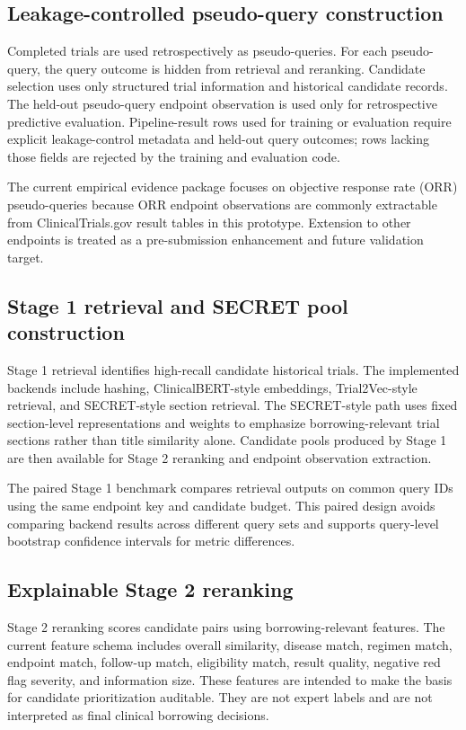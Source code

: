 \documentclass[11pt]{article}
\begin{document}
\subsection{Leakage-controlled pseudo-query construction}

Completed trials are used retrospectively as pseudo-queries. For each pseudo-query, the query outcome is hidden from retrieval and reranking. Candidate selection uses only structured trial information and historical candidate records. The held-out pseudo-query endpoint observation is used only for retrospective predictive evaluation. Pipeline-result rows used for training or evaluation require explicit leakage-control metadata and held-out query outcomes; rows lacking those fields are rejected by the training and evaluation code.

The current empirical evidence package focuses on objective response rate (ORR) pseudo-queries because ORR endpoint observations are commonly extractable from ClinicalTrials.gov result tables in this prototype. Extension to other endpoints is treated as a pre-submission enhancement and future validation target.

\subsection{Stage 1 retrieval and SECRET pool construction}

Stage 1 retrieval identifies high-recall candidate historical trials. The implemented backends include hashing, ClinicalBERT-style embeddings, Trial2Vec-style retrieval, and SECRET-style section retrieval. The SECRET-style path uses fixed section-level representations and weights to emphasize borrowing-relevant trial sections rather than title similarity alone. Candidate pools produced by Stage 1 are then available for Stage 2 reranking and endpoint observation extraction.

The paired Stage 1 benchmark compares retrieval outputs on common query IDs using the same endpoint key and candidate budget. This paired design avoids comparing backend results across different query sets and supports query-level bootstrap confidence intervals for metric differences.

\subsection{Explainable Stage 2 reranking}

Stage 2 reranking scores candidate pairs using borrowing-relevant features. The current feature schema includes overall similarity, disease match, regimen match, endpoint match, follow-up match, eligibility match, result quality, negative red flag severity, and information size. These features are intended to make the basis for candidate prioritization auditable. They are not expert labels and are not interpreted as final clinical borrowing decisions.
\end{document}
